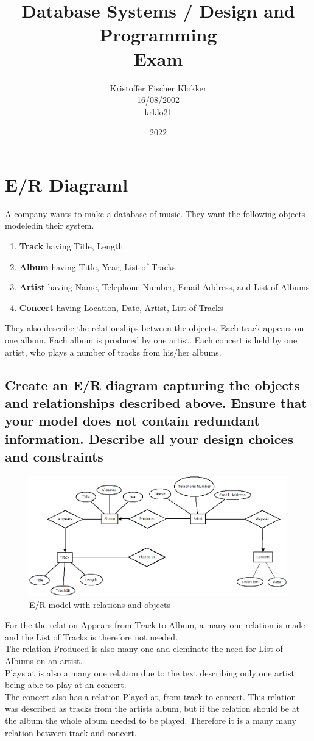 \documentclass[12pt, a4paper]{article}
\title{Database Systems / Design and Programming\\Exam}
\date{2022}
\author{Kristoffer Fischer Klokker\\ 16/08/2002\\ krklo21}
\begin{document}
	\maketitle
	\clearpage
	\tableofcontents
	\clearpage
	\section{E/R Diagraml}
		A company wants to make a database of music.  They want the following objects modeledin their system.\\
		\begin{enumerate}
			\item \textbf{Track} having Title, Length
			\item \textbf{Album} having Title, Year, List of Tracks
			\item \textbf{Artist} having Name, Telephone Number, Email Address, and List of Albums
			\item \textbf{Concert} having Location, Date, Artist, List of Tracks
		\end{enumerate}
		They also describe the relationships between the objects.  Each track appears on one album.  Each album is produced by one artist.  Each concert is held by one artist, who plays a number of tracks from his/her albums.
		\subsection{Create  an  E/R  diagram  capturing  the  objects  and  relationships  described  above. Ensure that your model does not contain redundant information. Describe all your design choices and constraints}
			\begin{figure}[h!]
				\includegraphics[width=\textwidth]{assets/ER1.png}
				\centering
				\caption{E/R model with relations and objects}
			\end{figure}
			For the the relation Appears from Track to Album, a many one relation is made and the List of Tracks is therefore not needed.\\
			The relation Produced is also many one and eleminate the need for List of Albums on an artist.\\
			Plays at is also a many one relation due to the text describing only one artist being able to play at an concert.\\
			The concert also has a relation Played at, from track to concert. This relation was described as tracks from the artists album, but if the relation should be at the album the whole album needed to be played. Therefore it is a many many relation between track and concert.
\end{document}
